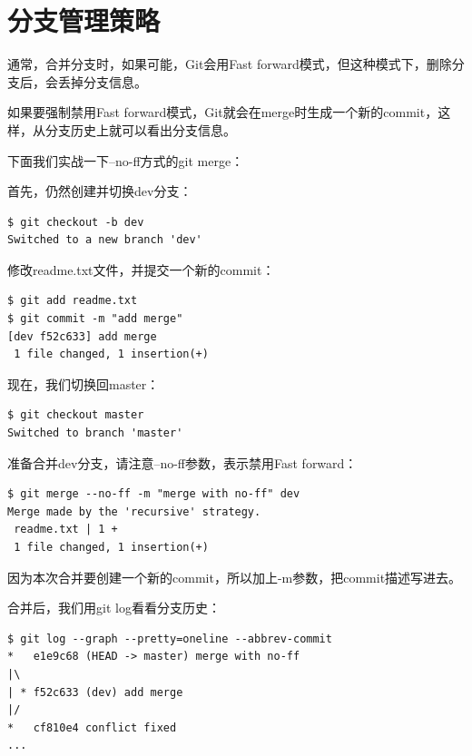 \section{分支管理策略}
通常，合并分支时，如果可能，Git会用Fast forward模式，但这种模式下，删除分支后，会丢掉分支信息。

如果要强制禁用Fast forward模式，Git就会在merge时生成一个新的commit，这样，从分支历史上就可以看出分支信息。

下面我们实战一下--no-ff方式的git merge：

首先，仍然创建并切换dev分支：

\begin{verbatim}
$ git checkout -b dev
Switched to a new branch 'dev'
\end{verbatim}

修改readme.txt文件，并提交一个新的commit：

\begin{verbatim}
$ git add readme.txt 
$ git commit -m "add merge"
[dev f52c633] add merge
 1 file changed, 1 insertion(+)
\end{verbatim}

现在，我们切换回master：

\begin{verbatim}
$ git checkout master
Switched to branch 'master'
\end{verbatim}

准备合并dev分支，请注意--no-ff参数，表示禁用Fast forward：

\begin{verbatim}
$ git merge --no-ff -m "merge with no-ff" dev
Merge made by the 'recursive' strategy.
 readme.txt | 1 +
 1 file changed, 1 insertion(+)
\end{verbatim}

因为本次合并要创建一个新的commit，所以加上-m参数，把commit描述写进去。

合并后，我们用git log看看分支历史：

\begin{verbatim}
$ git log --graph --pretty=oneline --abbrev-commit
*   e1e9c68 (HEAD -> master) merge with no-ff
|\  
| * f52c633 (dev) add merge
|/  
*   cf810e4 conflict fixed
...
\end{verbatim}

